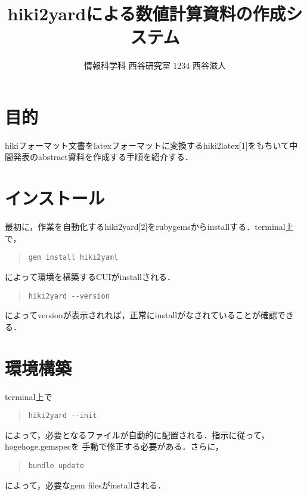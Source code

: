 \documentclass[10pt,a4j,twocolumn]{jsarticle}
\begin{document}
\title{hiki2yardによる数値計算資料の作成システム}
\author{情報科学科 西谷研究室 1234 西谷滋人}
\date{}
\maketitle
\section{目的}
hikiフォーマット文書をlatexフォーマットに変換するhiki2latex[1]をもちいて中間発表のabstract資料を作成する手順を紹介する．

\section{インストール}
最初に，作業を自動化するhiki2yard[2]をrubygemsからinstallする．terminal上で，
\begin{quote}\begin{verbatim}
gem install hiki2yaml
\end{verbatim}\end{quote}
によって環境を構築するCUIがinstallされる．
\begin{quote}\begin{verbatim}
hiki2yard --version
\end{verbatim}\end{quote}
によってversionが表示されれば，正常にinstallがなされていることが確認できる．

\section{環境構築}
terminal上で
\begin{quote}\begin{verbatim}
hiki2yard --init
\end{verbatim}\end{quote}
によって，必要となるファイルが自動的に配置される．指示に従って，hogehoge.gemspecを
手動で修正する必要がある．さらに，
\begin{quote}\begin{verbatim}
bundle update
\end{verbatim}\end{quote}
によって，必要なgem filesがinstallされる．
\end{document}
